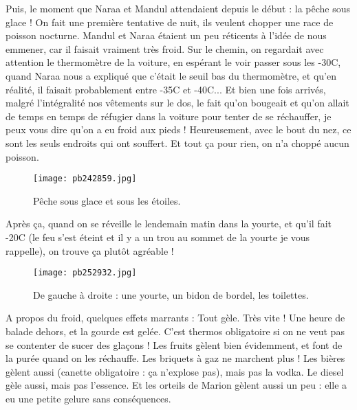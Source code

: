 \documentclass{book}
\begin{document}
Puis, le moment que Naraa et Mandul attendaient depuis le début : la pêche sous glace ! On fait une première tentative de nuit, ils veulent chopper une race de poisson nocturne. Mandul et Naraa étaient un peu réticents à l'idée de nous emmener, car il faisait vraiment très froid. Sur le chemin, on regardait avec attention le thermomètre de la voiture, en espérant le voir passer sous les -30\textdegree C, quand Naraa nous a expliqué que c'était le seuil bas du thermomètre, et qu'en réalité, il faisait probablement entre -35\textdegree C et -40\textdegree C... Et bien une fois arrivés, malgré l'intégralité nos vêtements sur le dos, le fait qu'on bougeait et qu'on allait de temps en temps de réfugier dans la voiture pour tenter de se réchauffer, je peux vous dire qu'on a eu froid aux pieds ! Heureusement, avec le bout du nez, ce sont les seuls endroits qui ont souffert. Et tout ça pour rien, on n'a choppé aucun poisson.


\begin{figure}[h]
\centering
\texttt{[image: pb242859.jpg]}
\caption*{ Pêche sous glace et sous les étoiles.}
\end{figure}

Après ça, quand on se réveille le lendemain matin dans la yourte, et qu'il fait -20\textdegree C (le feu s'est éteint et il y a un trou au sommet de la yourte je vous rappelle), on trouve ça plutôt agréable !


\begin{figure}[h]
\centering
\texttt{[image: pb252932.jpg]}
\caption*{ De gauche à droite : une yourte, un bidon de bordel, les toilettes.}
\end{figure}

A propos du froid, quelques effets marrants : Tout gèle. Très vite ! Une heure de balade dehors, et la gourde est gelée. C'est thermos obligatoire si on ne veut pas se contenter de sucer des glaçons ! Les fruits gèlent bien évidemment, et font de la purée quand on les réchauffe. Les briquets à gaz ne marchent plus ! Les bières gèlent aussi (canette obligatoire : ça n'explose pas), mais pas la vodka. Le diesel gèle aussi, mais pas l'essence. Et les orteils de Marion gèlent aussi un peu : elle a eu une petite gelure sans conséquences.
\end{document}

